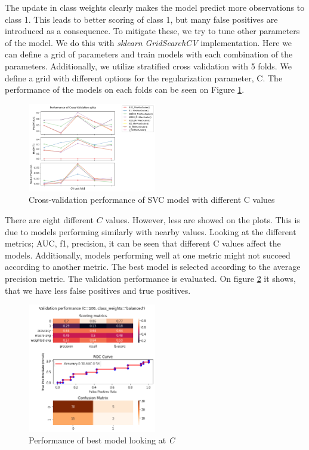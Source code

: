 The update in class weights clearly makes the model predict more observations to class 1. This leads to better scoring of class 1, but many false positives are introduced as a consequence. To mitigate these, we try to tune other parameters of the model. We do this with \textit{sklearn} \textit{GridSearchCV} implementation. Here we can define a grid of parameters and train models with each combination of the parameters. Additionally, we utilize stratified cross validation with 5 folds. We define a grid with different options for the regularization parameter, C. The performance of the models on each folds can be seen on Figure \ref{fig:results_gridcv_balanced_C}.     

\begin{figure}[htbp!]
  \centering
  \includegraphics[width=0.5\textwidth]{../project/images/results_gridcv_balanced-C.png}
  \caption{Cross-validation performance of SVC model with different C values}
  \label{fig:results_gridcv_balanced_C}
\end{figure}
There are eight different $C$ values. However, less are showed on the plots. This is due to models performing similarly with nearby values. Looking at the different metrics; AUC, f1, precision, it can be seen that different C values affect the models. Additionally, models performing well at one metric might not succeed according to another metric. The best model is selected according to the average precision metric. The validation performance is evaluated. On figure \ref{fig:results_gridcv_balanced_C_metrics} it shows, that we have less false positives and true positives.   
\begin{figure}[htbp!]
  \centering
  \includegraphics[width=0.5\textwidth]{../project/images/results_gridcv_balanced-C_metrics.png}
  \caption{Performance of best model looking at \textit{C}}
  \label{fig:results_gridcv_balanced_C_metrics}
\end{figure}

